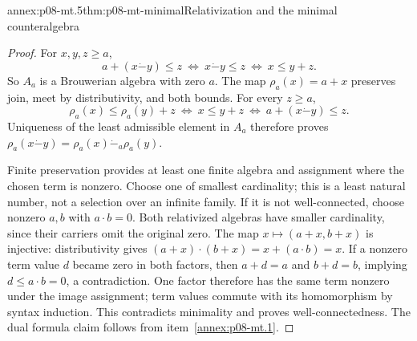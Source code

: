 \begin{annexitem}{annex:p08-mt.5}{thm:p08-mt-minimal}{Relativization and the minimal counteralgebra}
\begin{proof}
For \(x,y,z\geq a\),
\[
 a+(x\mathbin{\dot{-}}y)\leq z
 \ \Longleftrightarrow\ x\mathbin{\dot{-}}y\leq z
 \ \Longleftrightarrow\ x\leq y+z.
\]
So \(A_a\) is a Brouwerian algebra with zero \(a\). The map
\(\rho_a(x)=a+x\) preserves join, meet by distributivity, and both
bounds. For every \(z\geq a\),
\[
 \rho_a(x)\leq\rho_a(y)+z
 \ \Longleftrightarrow\ x\leq y+z
 \ \Longleftrightarrow\ a+(x\mathbin{\dot{-}}y)\leq z.
\]
Uniqueness of the least admissible element in \(A_a\) therefore proves
\(\rho_a(x\mathbin{\dot{-}}y)
 =\rho_a(x)\mathbin{\dot{-}}_a\rho_a(y)\).

Finite preservation provides at least one finite algebra and assignment
where the chosen term is nonzero. Choose one of smallest cardinality;
this is a least natural number, not a selection over an infinite family.
If it is not well-connected, choose nonzero \(a,b\) with
\(a\cdot b=0\). Both relativized algebras have smaller cardinality,
since their carriers omit the original zero. The map
\(x\mapsto(a+x,b+x)\) is injective: distributivity gives
\((a+x)\cdot(b+x)=x+(a\cdot b)=x\).
If a nonzero term value \(d\) became zero in both factors, then
\(a+d=a\) and \(b+d=b\), implying \(d\leq a\cdot b=0\), a
contradiction. One factor therefore has the same term nonzero under
the image assignment; term values commute with its homomorphism by
syntax induction. This contradicts minimality and proves well-connectedness.
The dual formula claim follows from item~\ref{annex:p08-mt.1}.
\end{proof}
\end{annexitem}

